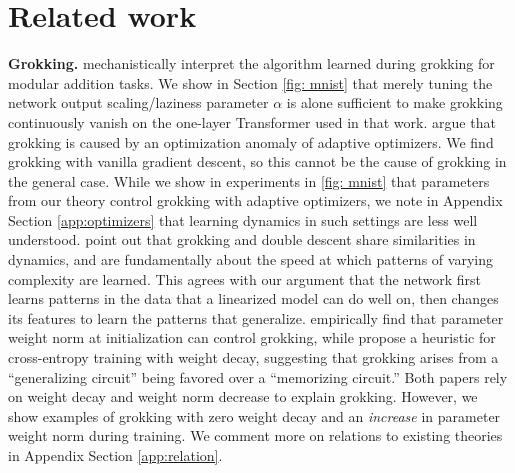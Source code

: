 \documentclass{article} %
\begin{document}
\section{Related work}
\textbf{Grokking.} \cite{nanda2023progress} mechanistically interpret the algorithm learned during grokking for modular addition tasks. We show in Section \ref{fig: mnist} that merely tuning the network output scaling/laziness parameter $\alpha$ is alone sufficient to make grokking continuously vanish on the one-layer Transformer used in that work. \cite{thilak2022slingshot} argue that grokking is caused by an optimization anomaly of adaptive optimizers. We find grokking with vanilla gradient descent, so this cannot be the cause of grokking in the general case. While we show in experiments in \ref{fig: mnist} that parameters from our theory control grokking with adaptive optimizers, we note in Appendix Section \ref{app:optimizers} that learning dynamics in such settings are less well understood. \cite{davies2023unifying} point out that grokking and double descent share similarities in dynamics, and are fundamentally about the speed at which patterns of varying complexity are learned. This agrees with our argument that the network first learns patterns in the data that a linearized model can do well on, then changes its features to learn the patterns that generalize. \cite{liu2022omnigrok} empirically find that parameter weight norm at initialization can control grokking, while \cite{varma2023explaining} propose a heuristic for cross-entropy training with weight decay, suggesting that grokking arises from a ``generalizing circuit'' being favored over a ``memorizing circuit.'' Both papers rely on weight decay and weight norm decrease to explain grokking. However, we show examples of grokking with zero weight decay and an \textit{increase} in parameter weight norm during training. We comment more on relations to existing theories in Appendix Section \ref{app:relation}.
\end{document}
